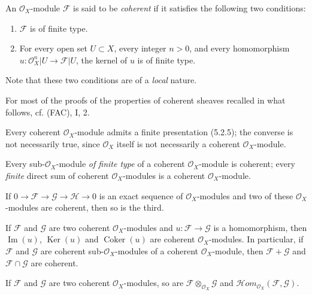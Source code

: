 \begin{env}[5.3.1]
\label{0.5.3.1}
An $\mathcal{O}_X$-module $\mathcal{F}$ is said to be \emph{coherent} if it
satisfies the following two conditions:
\begin{enumerate}
  \item[$a)$] $\mathcal{F}$ is of finite type.
  \item[$b)$] For every open set $U\subset X$, every integer $n>0$, and every
    homomorphism
    $u:\mathcal{O}_X^n|U\to\mathcal{F}|U$, the kernel of $u$ is of finite type.
\end{enumerate}
Note that these two conditions are of a \emph{local} nature.

For most of the proofs of the properties of coherent sheaves
recalled in what follows, cf. (FAC), I, 2.
\end{env}

\begin{env}[5.3.2]
\label{0.5.3.2}
Every coherent $\mathcal{O}_X$-module admits a finite presentation (5.2.5); the
converse is not necessarily true, since $\mathcal{O}_X$ itself is not
necessarily a coherent $\mathcal{O}_X$-module.

Every sub-$\mathcal{O}_X$-module \emph{of finite type} of a coherent
$\mathcal{O}_X$-module is coherent; every \emph{finite} direct sum
of coherent $\mathcal{O}_X$-modules is a coherent $\mathcal{O}_X$-module.
\end{env}

\begin{env}[5.3.3]
\label{0.5.3.3}
If $0\to\mathcal{F}\to\mathcal{G}\to\mathcal{H}\to0$ is an exact sequence of
$\mathcal{O}_X$-modules and two of these $\mathcal{O}_X$-modules are
coherent, then so is the third.
\end{env}

\begin{env}[5.3.4]
\label{0.5.3.4}
If $\mathcal{F}$ and $\mathcal{G}$ are two coherent $\mathcal{O}_X$-modules and
$u:\mathcal{F}\to\mathcal{G}$ is a homomorphism, then $\operatorname{Im}(u)$,
$\operatorname{Ker}(u)$ and $\operatorname{Coker}(u)$ are coherent
$\mathcal{O}_X$-modules. In particular, if $\mathcal{F}$ and
$\mathcal{G}$ are coherent sub-$\mathcal{O}_X$-modules of a
coherent $\mathcal{O}_X$-module, then $\mathcal{F}+\mathcal{G}$ and
$\mathcal{F}\cap\mathcal{G}$ are coherent.
\end{env}

\begin{env}[5.3.5]
\label{0.5.3.5}
If $\mathcal{F}$ and $\mathcal{G}$ are two coherent $\mathcal{O}_X$-modules,
so are $\mathcal{F}\otimes_{\mathcal{O}_X}\mathcal{G}$ and
$\mathcal{H}\!om_{\mathcal{O}_X}(\mathcal{F},\mathcal{G})$.
\end{env}

